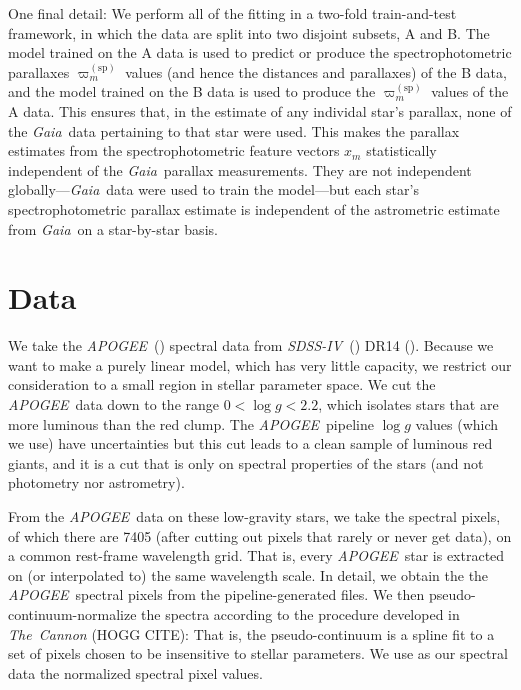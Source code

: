 \documentclass[modern]{aastex62}
\newcommand{\code}[1]{\texttt{\detokenize{#1}}}
\newcommand{\acronym}[1]{{\small{#1}}}
\newcommand{\project}[1]{\textsl{#1}}
\newcommand{\apogee}{\project{\acronym{APOGEE}}}
\newcommand{\gaia}{\project{Gaia}}
\newcommand{\sdssiv}{\project{\acronym{SDSS-IV}}}
\newcommand{\logg}{\log g}
\newcommand{\sparallax}{\varpi^{(\mathrm{sp})}}
\begin{document}
One final detail: We perform all of the fitting in a two-fold train-and-test framework,
in which the data are split into two disjoint subsets, A and B.
The model trained on the A data is used to predict or produce
the spectrophotometric parallaxes $\sparallax_m$ values (and hence
the distances and parallaxes) of the B data,
and the model trained on the B data is used to 
produce the $\sparallax_m$ values of the A data.
This ensures that, in the estimate of any individal star's
parallax, none of the \gaia\ data pertaining to that star were used.
This makes the parallax estimates from the spectrophotometric feature vectors
$x_m$ statistically independent of the \gaia\ parallax measurements.
They are not independent globally---\gaia\ data were used to train the model---but
each star's spectrophotometric parallax estimate is independent
of the astrometric estimate from \gaia\ on a star-by-star basis.

\section{Data}

We take the \apogee\ (\citealt{aapogee, wapogee, apogee}) spectral data
from \sdssiv\ (\citealt{sdssiv}) \acronym{DR14} (\citealt{dr14}).
Because we want to make a purely linear model, which has very little capacity,
we restrict our consideration to a small region in stellar parameter space.
We cut the \apogee\ data down to the range $0<\logg<2.2$, which isolates
stars that are more luminous than the red clump.
The \apogee\ pipeline $\logg$ values (which we use) have uncertainties but
this cut leads to a clean sample of luminous red giants, and it is a cut
that is only on spectral properties of the stars (and not photometry nor astrometry).

From the \apogee\ data on these low-gravity stars, we take the spectral pixels,
of which there are 7405 (after cutting out pixels that rarely or never get data),
on a common rest-frame wavelength grid.
That is, every \apogee\ star is extracted on (or interpolated to)
the same wavelength scale.
In detail, we obtain the
the \apogee\ spectral pixels from the pipeline-generated \code{aspcapStar} files.
We then pseudo-continuum-normalize the spectra according to the procedure developed
in \project{The~Cannon} (HOGG CITE):
That is, the pseudo-continuum is a spline fit to a set
of pixels chosen to be insensitive to stellar parameters.
We use as our spectral data the normalized spectral pixel values.
\end{document}
